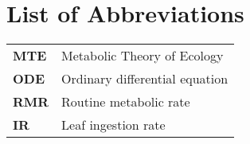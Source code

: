 
\section*{List of Abbreviations}

\begin{tabular}{ l l }
  \textbf{MTE} & Metabolic Theory of Ecology     \\
  \textbf{ODE} & Ordinary differential equation  \\
  \textbf{RMR} & Routine metabolic rate          \\
  \textbf{IR}  & Leaf ingestion rate             \\
\end{tabular}

